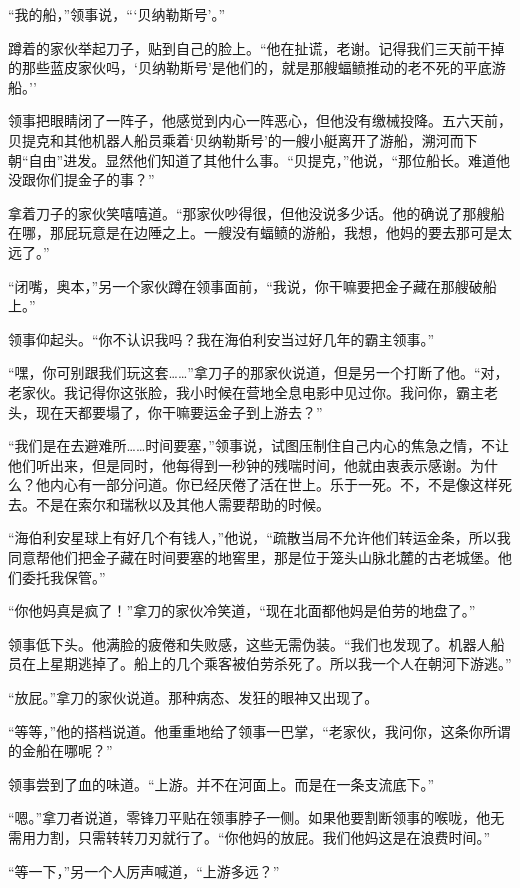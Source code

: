 \documentclass[AutoFakeBold=true]{book}
\begin{document}
``我的船，''领事说，```贝纳勒斯号'。''

蹲着的家伙举起刀子，贴到自己的脸上。``他在扯谎，老谢。记得我们三天前干掉的那些蓝皮家伙吗，`贝纳勒斯号'是他们的，就是那艘蝠鲼推动的老不死的平底游船。''

领事把眼睛闭了一阵子，他感觉到内心一阵恶心，但他没有缴械投降。五六天前，贝提克和其他机器人船员乘着`贝纳勒斯号'的一艘小艇离开了游船，溯河而下朝``自由''进发。显然他们知道了其他什么事。``贝提克，''他说，``那位船长。难道他没跟你们提金子的事？''

拿着刀子的家伙笑嘻嘻道。``那家伙吵得很，但他没说多少话。他的确说了那艘船在哪，那屁玩意是在边陲之上。一艘没有蝠鲼的游船，我想，他妈的要去那可是太远了。''

``闭嘴，奥本，''另一个家伙蹲在领事面前，``我说，你干嘛要把金子藏在那艘破船上。''

领事仰起头。``你不认识我吗？我在海伯利安当过好几年的霸主领事。''

``嘿，你可别跟我们玩这套……''拿刀子的那家伙说道，但是另一个打断了他。``对，老家伙。我记得你这张脸，我小时候在营地全息电影中见过你。我问你，霸主老头，现在天都要塌了，你干嘛要运金子到上游去？''

``我们是在去避难所……时间要塞，''领事说，试图压制住自己内心的焦急之情，不让他们听出来，但是同时，他每得到一秒钟的残喘时间，他就由衷表示感谢。{\kaishu 为什么？}他内心有一部分问道。{\kaishu 你已经厌倦了活在世上。乐于一死。}不，不是像这样死去。不是在索尔和瑞秋以及其他人需要帮助的时候。

``海伯利安星球上有好几个有钱人，''他说，``疏散当局不允许他们转运金条，所以我同意帮他们把金子藏在时间要塞的地窖里，那是位于笼头山脉北麓的古老城堡。他们委托我保管。''

``你他妈真是疯了！''拿刀的家伙冷笑道，``现在北面都他妈是伯劳的地盘了。''

领事低下头。他满脸的疲倦和失败感，这些无需伪装。``我们也发现了。机器人船员在上星期逃掉了。船上的几个乘客被伯劳杀死了。所以我一个人在朝河下游逃。''

``放屁。''拿刀的家伙说道。那种病态、发狂的眼神又出现了。

``等等，''他的搭档说道。他重重地给了领事一巴掌，``老家伙，我问你，这条你所谓的金船在哪呢？''

领事尝到了血的味道。``上游。并不在河面上。而是在一条支流底下。''

``嗯。''拿刀者说道，零锋刀平贴在领事脖子一侧。如果他要割断领事的喉咙，他无需用力割，只需转转刀刃就行了。``你他妈的放屁。我们他妈这是在浪费时间。''

``等一下，''另一个人厉声喊道，``上游多远？''
\end{document}
